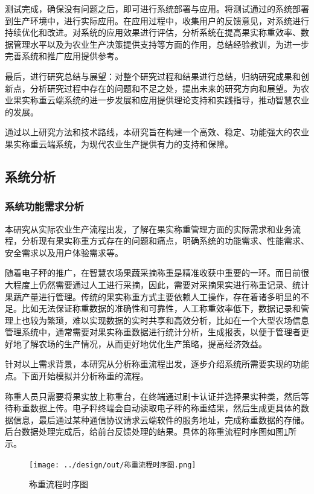 \documentclass{xduugmr}
\begin{document}
测试完成，确保没有问题之后，即可进行系统部署与应用。将测试通过的系统部署到生产环境中，进行实际应用。在应用过程中，收集用户的反馈意见，对系统进行持续优化和改进。对系统的应用效果进行评估，分析系统在提高果实称重效率、数据管理水平以及为农业生产决策提供支持等方面的作用，总结经验教训，为进一步完善系统和推广应用提供参考。

最后，进行研究总结与展望：对整个研究过程和结果进行总结，归纳研究成果和创新点，分析研究过程中存在的问题和不足之处，提出未来的研究方向和展望。为农业果实称重云端系统的进一步发展和应用提供理论支持和实践指导，推动智慧农业的发展。

通过以上研究方法和技术路线，本研究旨在构建一个高效、稳定、功能强大的农业果实称重云端系统，为现代农业生产提供有力的支持和保障。

\subsection{系统分析}

\subsubsection{系统功能需求分析}

本研究从实际农业生产流程出发，了解在果实称重管理方面的实际需求和业务流程，分析现有果实称重方式存在的问题和痛点，明确系统的功能需求、性能需求、安全需求以及用户体验需求等。

随着电子秤的推广，在智慧农场果蔬采摘称重是精准收获中重要的一环。而目前很大程度上仍然需要通过人工进行采摘，因此，需要对采摘果实进行称重记录、统计果蔬产量进行管理。传统的果实称重方式主要依赖人工操作，存在着诸多明显的不足。比如无法保证称重数据的准确性和可靠性，人工称重效率低下，数据记录和管理上也较为繁琐，难以实现数据的实时共享和高效分析，比如在一个大型农场信息管理系统中，通常需要对果实称重数据进行统计分析，生成报表，以便于管理者更好地了解农场的生产情况，从而更好地优化生产策略，提高经济效益。

针对以上需求背景，本研究从分析称重流程出发，逐步介绍系统所需要实现的功能点。下面开始模拟并分析称重的流程。

称重人员只需要将果实放上称重台，在终端通过刷卡认证并选择果实种类，然后等待称重数据上传。电子秤终端会自动读取电子秤的称重结果，然后生成更具体的数据信息，最后通过某种通信协议请求云端软件的服务地址，完成称重数据的存储。后台数据处理完成后，给前台反馈处理的结果。具体的称重流程时序图如图\ref{fig:称重流程时序图}所示。

\begin{figure}[H]
    \centering
    \texttt{[image: ../design/out/称重流程时序图.png]}
    \caption{称重流程时序图}
    \label{fig:称重流程时序图}
\end{figure}
\end{document}
